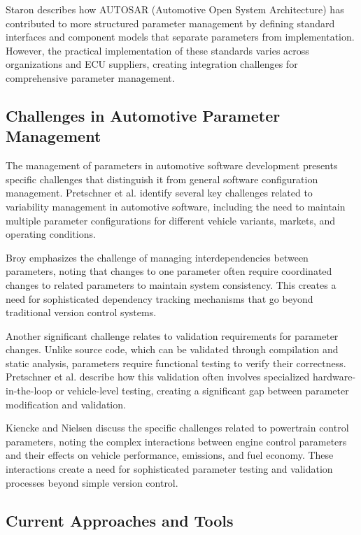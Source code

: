 Staron \cite{staron2021automotive} describes how AUTOSAR (Automotive Open System Architecture) has contributed to more structured parameter management by defining standard interfaces and component models that separate parameters from implementation. However, the practical implementation of these standards varies across organizations and \ac{ECU} suppliers, creating integration challenges for comprehensive parameter management.

\subsection{Challenges in Automotive Parameter Management}
\label{subsec:challenges-parameter-management}

The management of parameters in automotive software development presents specific challenges that distinguish it from general software configuration management. Pretschner et al. \cite{pretschner2007software} identify several key challenges related to variability management in automotive software, including the need to maintain multiple parameter configurations for different vehicle variants, markets, and operating conditions.

Broy \cite{broy2006challenges} emphasizes the challenge of managing interdependencies between parameters, noting that changes to one parameter often require coordinated changes to related parameters to maintain system consistency. This creates a need for sophisticated dependency tracking mechanisms that go beyond traditional version control systems.

Another significant challenge relates to validation requirements for parameter changes. Unlike source code, which can be validated through compilation and static analysis, parameters require functional testing to verify their correctness. Pretschner et al. \cite{pretschner2007software} describe how this validation often involves specialized hardware-in-the-loop or vehicle-level testing, creating a significant gap between parameter modification and validation.

Kiencke and Nielsen \cite{kiencke2000automotive} discuss the specific challenges related to powertrain control parameters, noting the complex interactions between engine control parameters and their effects on vehicle performance, emissions, and fuel economy. These interactions create a need for sophisticated parameter testing and validation processes beyond simple version control.

\subsection{Current Approaches and Tools}
\label{subsec:current-approaches-tools}

